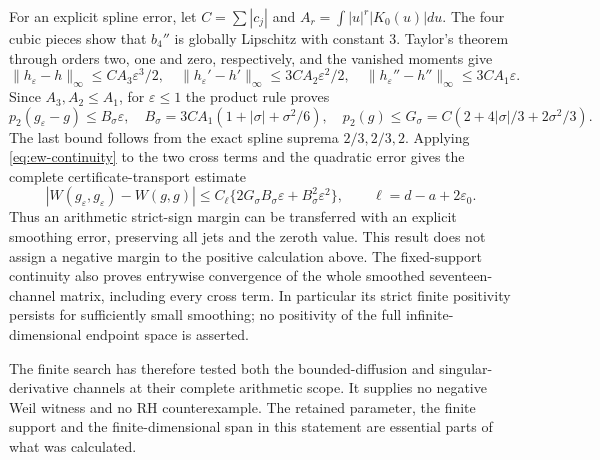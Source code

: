 For an explicit spline error, let $C=\sum|c_j|$ and
$A_r=\int|u|^r|K_0(u)|du$. The four cubic pieces show that $b_4''$
is globally Lipschitz with constant $3$. Taylor's theorem through
orders two, one and zero, respectively, and the vanished moments give
\[
 \|h_\varepsilon-h\|_\infty\le CA_3\varepsilon^3/2,\quad
 \|h_\varepsilon'-h'\|_\infty\le3CA_2\varepsilon^2/2,\quad
 \|h_\varepsilon''-h''\|_\infty\le3CA_1\varepsilon.
\]
Since $A_3,A_2\le A_1$, for $\varepsilon\le1$ the product rule proves
\[
 p_2(g_\varepsilon-g)\le B_\sigma\varepsilon,\quad
 B_\sigma=3CA_1(1+|\sigma|+\sigma^2/6),\quad
 p_2(g)\le G_\sigma=C(2+4|\sigma|/3+2\sigma^2/3).
\]
The last bound follows from the exact spline suprema $2/3,2/3,2$.
Applying \eqref{eq:ew-continuity} to the two cross terms and the
quadratic error gives the complete certificate-transport estimate
\begin{equation}
 |W(g_\varepsilon,g_\varepsilon)-W(g,g)|
 \le C_\ell\{2G_\sigma B_\sigma\varepsilon+
                                  B_\sigma^2\varepsilon^2\},
 \qquad \ell=d-a+2\varepsilon_0.
 \label{eq:ew-smooth-error}
\end{equation}
Thus an arithmetic strict-sign margin can be transferred with an
explicit smoothing error, preserving all jets and the zeroth value.
This result does not assign a negative margin to the positive
calculation above. The fixed-support continuity also proves entrywise
convergence of the whole smoothed seventeen-channel matrix, including
every cross term. In particular its strict finite positivity persists
for sufficiently small smoothing; no positivity of the full
infinite-dimensional endpoint space is asserted.

The finite search has therefore tested both the bounded-diffusion and
singular-derivative channels at their complete arithmetic scope.
It supplies no negative Weil witness and no RH counterexample.
The retained parameter, the finite support and the finite-dimensional
span in this statement are essential parts of what was calculated.
